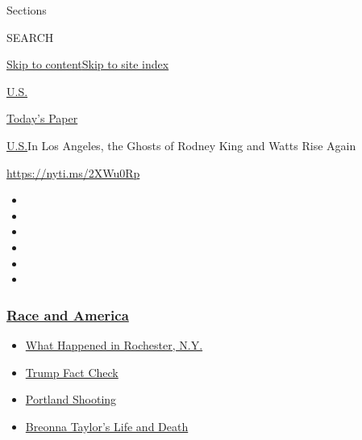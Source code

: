 Sections

SEARCH

\protect\hyperlink{site-content}{Skip to
content}\protect\hyperlink{site-index}{Skip to site index}

\href{https://www.nytimes3xbfgragh.onion/section/us}{U.S.}

\href{https://myaccount.nytimes3xbfgragh.onion/auth/login?response_type=cookie\&client_id=vi}{}

\href{https://www.nytimes3xbfgragh.onion/section/todayspaper}{Today's
Paper}

\href{/section/us}{U.S.}\textbar{}In Los Angeles, the Ghosts of Rodney
King and Watts Rise Again

\url{https://nyti.ms/2XWu0Rp}

\begin{itemize}
\item
\item
\item
\item
\item
\item
\end{itemize}

\hypertarget{race-and-america}{%
\subsubsection{\texorpdfstring{\href{https://www.nytimes3xbfgragh.onion/news-event/george-floyd-protests-minneapolis-new-york-los-angeles?name=styln-george-floyd\&region=TOP_BANNER\&block=storyline_menu_recirc\&action=click\&pgtype=Article\&impression_id=f8a7dc80-f2be-11ea-8fbf-5db5f4b653c8\&variant=undefined}{Race
and America}}{Race and America}}\label{race-and-america}}

\begin{itemize}
\tightlist
\item
  \href{https://www.nytimes3xbfgragh.onion/2020/09/04/nyregion/rochester-police-daniel-prude.html?name=styln-george-floyd\&region=TOP_BANNER\&block=storyline_menu_recirc\&action=click\&pgtype=Article\&impression_id=f8a7dc81-f2be-11ea-8fbf-5db5f4b653c8\&variant=undefined}{What
  Happened in Rochester, N.Y.}
\item
  \href{https://www.nytimes3xbfgragh.onion/2020/09/01/us/politics/trump-fact-check-protests.html?name=styln-george-floyd\&region=TOP_BANNER\&block=storyline_menu_recirc\&action=click\&pgtype=Article\&impression_id=f8a7dc82-f2be-11ea-8fbf-5db5f4b653c8\&variant=undefined}{Trump
  Fact Check}
\item
  \href{https://www.nytimes3xbfgragh.onion/2020/08/30/us/portland-shooting-explained.html?name=styln-george-floyd\&region=TOP_BANNER\&block=storyline_menu_recirc\&action=click\&pgtype=Article\&impression_id=f8a80390-f2be-11ea-8fbf-5db5f4b653c8\&variant=undefined}{Portland
  Shooting}
\item
  \href{https://www.nytimes3xbfgragh.onion/2020/08/30/us/breonna-taylor-police-killing.html?name=styln-george-floyd\&region=TOP_BANNER\&block=storyline_menu_recirc\&action=click\&pgtype=Article\&impression_id=f8a80391-f2be-11ea-8fbf-5db5f4b653c8\&variant=undefined}{Breonna
  Taylor's Life and Death}
\end{itemize}

